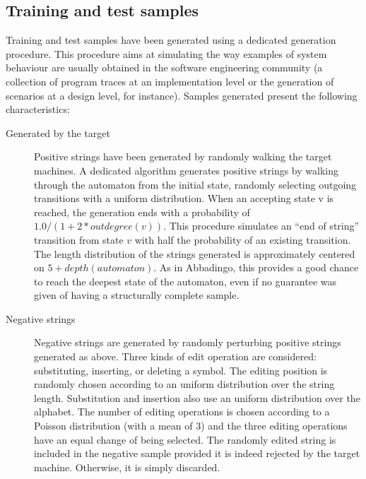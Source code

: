 \subsection{Training and test samples\label{subsection:stamina-samples}}

Training and test samples have been generated using a dedicated generation procedure. This procedure aims at simulating the way examples of system behaviour are usually obtained in the software engineering community (a collection of program traces at an implementation level or the generation of scenarios at a design level, for instance). Samples generated present the following characteristics:

\begin{description}

\item[Generated by the target] Positive strings have been generated by randomly walking the target machines. A dedicated algorithm generates positive strings by walking through the automaton from the initial state, randomly selecting outgoing transitions with a uniform distribution. When an accepting state v is reached, the generation ends with a probability of $1.0/(1 + 2*outdegree(v))$. This procedure simulates an ``end of string'' transition from state $v$ with half the probability of an existing transition. The length distribution of the strings generated is approximately centered on $5 + depth(automaton)$. As in Abbadingo, this provides a good chance to reach the deepest state of the automaton, even if no guarantee was given of having a structurally complete sample.

\item[Negative strings] Negative strings are generated by randomly perturbing positive strings generated as above. Three kinds of edit operation are considered: substituting, inserting, or deleting a symbol. The editing position is randomly chosen according to an uniform distribution over the string length. Substitution and insertion also use an uniform distribution over the alphabet. The number of editing operations is chosen according to a Poisson distribution (with a mean of 3) and the three editing operations have an equal change of being selected. The randomly edited string is included in the negative sample provided it is indeed rejected by the target machine. Otherwise, it is simply discarded.

\end{description}

